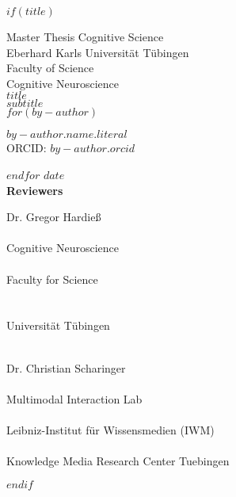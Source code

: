 
$if(title)$
{
\thispagestyle{empty}
\centering
\Large Master Thesis Cognitive Science\\
\huge Eberhard Karls Universität Tübingen \\
\Large Faculty of Science \\
\Large Cognitive Neuroscience \\
\vspace{4ex}
\huge\textbf{$title$}\\
\huge $subtitle$\\
\vspace{2ex}
$for(by-author)$
\begin{center}
\Large $by-author.name.literal$\\
\large ORCID: \href{https://orcid.org/$by-author.orcid$}{$by-author.orcid$}
\end{center}
$endfor$
\vspace{3ex}
\Large $date$\\
\vspace{3ex}
\Large\textbf{Reviewers}\\
\vspace{2ex}
\parbox{0.5\textwidth}{
	\begin{center}
		{\Large Dr. Gregor Hardieß}\\
		~\\
		\large Cognitive Neuroscience\\
		~\\
		Faculty for Science\\
		~\\
		~\\
		Universität Tübingen\\
		~\\
	\end{center}}
\hfill
\parbox{0.5\textwidth}{
	\begin{center}
  		{\Large Dr. Christian Scharinger}\\
  		~\\
  		\large Multimodal Interaction Lab\\
  		~\\
  		Leibniz-Institut für Wissensmedien (IWM)\\
  		~\\
  		Knowledge Media Research Center Tuebingen
  	\end{center}
 }
}
$endif$